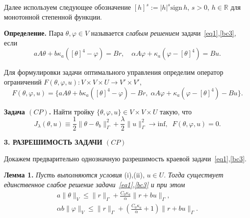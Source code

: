 \documentclass[12pt]{article}
\begin{document}
    Далее используем следующее обозначение
    $[h]^s := |h|^s \mathrm{sign}\, h$,
    $s > 0$, $h \in \mathbb R$ для монотонной степенной функции.


    {\bf Определение.} Пара $\theta, \varphi\in V$
    называется {\it слабым решением} задачи~\eqref{eq1},\eqref{bc3}, если
    \begin{equation}
        \label{w1}
        a A \theta + b \kappa_a ([\theta]^4 - \varphi ) = Br,\quad
        \alpha A \varphi + \kappa_a (\varphi - [\theta]^4)  = Bu.
    \end{equation}

    Для формулировки задачи оптимального управления определим оператор
    ограничений $F(\theta, \varphi, u) : V \times V \times U \rightarrow V' \times V'$,
    \[
        F(\theta, \varphi, u) = \{ aA\theta + b \kappa_a ( [\theta]^4- \varphi) - Br,\;
        \alpha A \varphi + \kappa_a (\varphi -[\theta]^4) - Bu\}.
    \]


    \textbf{Задача $(CP)$.} Найти тройку $\{\theta, \varphi, u \} \in V \times V \times U$
    такую, что
    \begin{equation}
        \label{CP}
        J_\lambda(\theta, u) \equiv \frac{1}{2}\|\theta -\theta_b\|^2_\Gamma
        + \frac{\lambda}{2}\|u\|^2_\Gamma \rightarrow \text{inf},\;\; F(\theta, \varphi, u)=0.
    \end{equation}





    \begin{center}
        \textbf{3. РАЗРЕШИМОСТЬ ЗАДАЧИ $(CP)$}
    \end{center}

    Докажем предварительно однозначную разрешимость краевой задачи~\eqref{eq1},\eqref{bc3}.

    \textbf{Лемма 1.}
    {\it
    Пусть выполняются условия} (i),(ii), $u\in U$. {\it Тогда
    существует единственное слабое решение задачи~\eqref{eq1},\eqref{bc3} и при этом}
    \begin{equation}
        \label{E1}
        \begin{aligned}
            a\|\theta\|_V \leq \|r\|_\Gamma + \frac{C_0\kappa_a}{\alpha}\|r+bu\|_\Gamma, \\
            \alpha b \|\varphi\|_V \leq \|r\|_\Gamma +
            \left(\frac{C_0\kappa_a}{\alpha} + 1\right)\|r+bu\|_\Gamma.
        \end{aligned}
    \end{equation}
\end{document}
